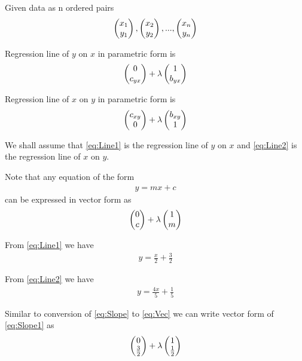 \documentclass[journal,12pt,twocolumn]{IEEEtran}
\begin{document}
\solution

Given data as n ordered pairs
\begin{align}
  \begin{pmatrix}x_1\\y_1\end{pmatrix}, \begin{pmatrix}x_2\\y_2\end{pmatrix}, ..., \begin{pmatrix}x_n\\y_n\end{pmatrix}
\end{align}

Regression line of $y$ on $x$ in parametric form is
\begin{align}
  \begin{pmatrix}0\\c_{yx}\end{pmatrix} + \lambda\begin{pmatrix}1\\b_{yx}\end{pmatrix}
  \label{eq:Main_yx}
\end{align}

Regression line of $x$ on $y$ in parametric form is
\begin{align}
  \begin{pmatrix}c_{xy}\\0\end{pmatrix} + \lambda\begin{pmatrix}b_{xy}\\1\end{pmatrix}
  \label{eq:Main_xy}
\end{align}


We shall assume that
\eqref{eq:Line1}
is the regression line of $y$ on $x$ and
\eqref{eq:Line2}
is the regression line of $x$ on $y$.

Note that any equation of the form
\begin{align}
  y = mx + c
  \label{eq:Slope}
\end{align}
can be expressed in vector form as
\begin{align}
  \begin{pmatrix}0\\c\end{pmatrix} + \lambda\begin{pmatrix}1\\m\end{pmatrix}
  \label{eq:Vec}
\end{align}

From
\eqref{eq:Line1}
we have
\begin{align}
  y = \frac{x}{2} + \frac{3}{2}
  \label{eq:Slope1}
\end{align}

From
\eqref{eq:Line2}
we have
\begin{align}
  y = \frac{4x}{5} + \frac{1}{5}
  \label{eq:Slope2}
\end{align}

Similar to conversion of
\eqref{eq:Slope}
to
\eqref{eq:Vec}
we can write vector form of
\eqref{eq:Slope1}
as
\begin{align}
  \begin{pmatrix}0\\\frac{3}{2}\end{pmatrix} + \lambda\begin{pmatrix}1\\\frac{1}{2}\end{pmatrix}
  \label{eq:Vec1}  
\end{align}
\end{document}
